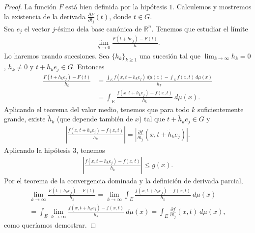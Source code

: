 \begin{proof}
La función $F$ está bien definida por la hipótesis $1$. Calculemos y mostremos la existencia de la derivada $\frac{\partial F}{\partial t_j}(t)$, donde $t \in G$.
\\
\newline
Sea $e_j$ el vector $j$-ésimo dela base canónica de $\mathbb{R}^n$. Tenemos que estudiar el límite
\begin{align*}
    \lim_{h \to 0}{\frac{F(t + he_j) - F(t)}{h}}.
\end{align*}
Lo haremos usando sucesiones. Sea $\{h_k\}_{k \ge 1}$ una sucesión tal que $\lim_{k \to \infty}{h_k} = 0$, $h_k \not = 0$ y $t + h_ke_j \in G$. Entonces
\begin{align*}
    {\frac{F(t + h_ke_j) - F(t)}{h_k}} &= \frac{\int_{E}{f(x,t+h_ke_j) \ d\mu(x)} - {\int_{E}{f(x,t)}} \ d\mu(x)}{h_k}\\
    &= \int_{E}{\frac{f(x,t+h_ke_j) - f(x,t)}{h_k} \ d\mu(x)}. 
\end{align*}
Aplicando el teorema del valor medio, tenemos que para todo $k$ suficientemente grande, existe $\widetilde{h}_k$ (que depende también de $x$) tal que $t + \widetilde{h}_ke_j \in G$ y
\begin{align*}
    \left| \frac{f(x,t+h_ke_j) - f(x,t)}{h_k} \right| = \left| \frac{\partial f}{\partial t_j}(x,t+\widetilde{h}_ke_j) \right|.
\end{align*}
Aplicando la hipótesis $3$, tenemos
\begin{align*}
    \left| \frac{f(x,t+h_ke_j) - f(x,t)}{h_k} \right| \leq g(x).
\end{align*}
Por el teorema de la convergencia dominada y la definición de derivada parcial,
\begin{align*}
    \lim_{k \to \infty}{\frac{F(t+h_ke_j) - F(t)}{h_k}} = \lim_{k \to \infty}{\int_{E}{\frac{f(x,t+h_ke_j) - f(x,t)}{h_k} \ d\mu(x)}}\\
    = \int_{E}{\lim_{k \to \infty}{\frac{f(x,t+h_ke_j) - f(x,t)}{h_k}} \ d\mu(x)} = \int_{E}{\frac{\partial f}{\partial t_j}(x,t) \ d\mu(x)},
\end{align*}
como queríamos demostrar.
\end{proof}

